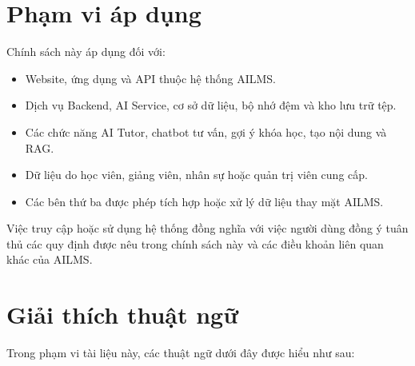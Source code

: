 \documentclass[12pt,a4paper]{article}
\begin{document}
\section{Phạm vi áp dụng}

Chính sách này áp dụng đối với:

\begin{itemize}
    \item Website, ứng dụng và API thuộc hệ thống AILMS.
    \item Dịch vụ Backend, AI Service, cơ sở dữ liệu, bộ nhớ đệm và kho lưu trữ tệp.
    \item Các chức năng AI Tutor, chatbot tư vấn, gợi ý khóa học, tạo nội dung và RAG.
    \item Dữ liệu do học viên, giảng viên, nhân sự hoặc quản trị viên cung cấp.
    \item Các bên thứ ba được phép tích hợp hoặc xử lý dữ liệu thay mặt AILMS.
\end{itemize}

Việc truy cập hoặc sử dụng hệ thống đồng nghĩa với việc người dùng đồng ý tuân thủ
các quy định được nêu trong chính sách này và các điều khoản liên quan khác của AILMS.

\section{Giải thích thuật ngữ}

Trong phạm vi tài liệu này, các thuật ngữ dưới đây được hiểu như sau:
\end{document}
